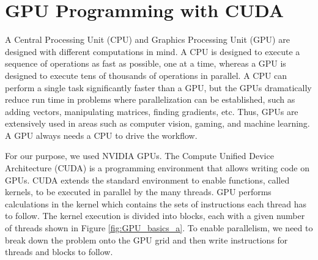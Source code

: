 \section{GPU Programming with CUDA {\cpp} }

A Central Processing Unit (CPU) and Graphics Processing Unit (GPU) are designed with different computations in mind. A CPU is designed to execute a sequence of operations as fast as possible, one at a time, whereas a GPU is designed to execute tens of thousands of operations in parallel. A CPU can perform a single task significantly faster than a GPU, but the GPUs dramatically reduce run time in problems where parallelization can be established, such as adding vectors, manipulating matrices, finding gradients, etc. Thus, GPUs are extensively used in areas such as computer vision, gaming, and machine learning. A GPU always needs a CPU to drive the workflow. 

For our purpose, we used NVIDIA GPUs. The Compute Unified Device Architecture (CUDA) is a programming environment that allows writing {\cpp} code on GPUs. CUDA extends the standard {\cpp} environment to enable functions, called kernels, to be executed in parallel by the many threads. GPU performs calculations in the kernel which contains the sets of instructions each thread has to follow. The kernel execution is divided into blocks, each with a given number of threads shown in Figure \ref{fig:GPU_basics_a}. To enable parallelism, we need to break down the problem onto the GPU grid and then write instructions for threads and blocks to follow.

